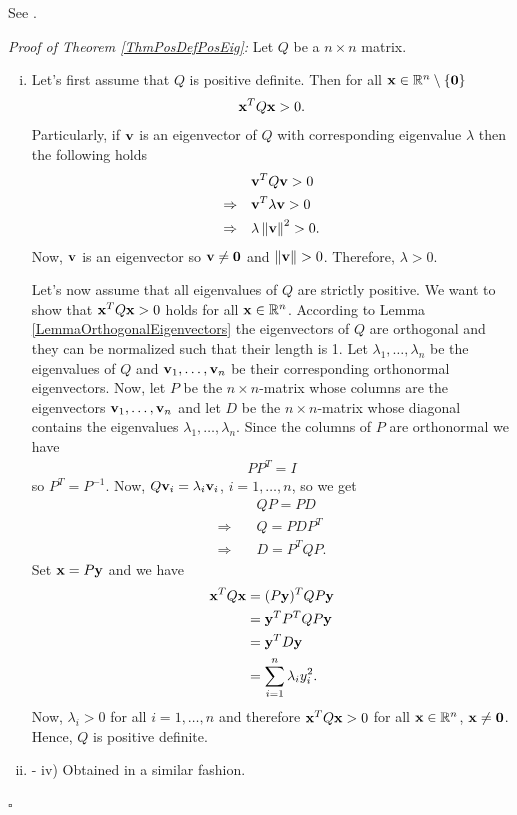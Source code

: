 \documentclass[a4paper,12pt,twoside,BCOR=10mm]{scrbook}
\begin{document}
See \citep{peressini1988mathematics}.

\textit{Proof of Theorem \ref{ThmPosDefPosEig}:}
Let $Q$ be a $n \times n$ matrix.
\begin{enumerate}[i)]
    \item
    Let's first assume that $Q$ is positive definite. Then for all $\mathbf{x} \in \mathbb{R}^{n}\setminus\{\mathbf{0}\}$
\begin{align*}
    \mathbf{x}^T Q \mathbf{x} > 0.
\end{align*}
Particularly, if $\mathbf{v}$ is an eigenvector of $Q$ with corresponding eigenvalue $\lambda$ then the following holds
\begin{align*}
    &\mathbf{v}^T Q \mathbf{v} > 0\\
    \Rightarrow\quad& \mathbf{v}^T \lambda \mathbf{v} > 0\\
    \Rightarrow\quad& \lambda \left\lVert\mathbf{v}\right\rVert^2 > 0.
\end{align*}
Now, $\mathbf{v}$ is an eigenvector so $\mathbf{v} \neq \mathbf{0}$ and $\left\lVert\mathbf{v}\right\rVert > 0$. Therefore, $\lambda > 0$.

Let's now assume that all eigenvalues of $Q$ are strictly positive. We want to show that $\mathbf{x}^T Q \mathbf{x} > 0$ holds for all $\mathbf{x} \in \mathbb{R}^{n}$. According to Lemma \ref{LemmaOrthogonalEigenvectors} the eigenvectors of $Q$ are orthogonal and they can be normalized such that their length is 1. Let $\lambda_1, \ldots, \lambda_n$ be the eigenvalues of $Q$ and $\mathbf{v}_1, \ldots, \mathbf{v}_n$ be their corresponding orthonormal eigenvectors. Now, let $P$ be the $n\times n$-matrix whose columns are the eigenvectors $\mathbf{v}_1, \ldots, \mathbf{v}_n$ and let $D$ be the $n\times n$-matrix whose diagonal contains the eigenvalues $\lambda_1, \ldots, \lambda_n$. Since the columns of $P$ are orthonormal we have
\begin{align*}
    PP^T = I
\end{align*}
so $P^T = P^{-1}$. Now, $Q\mathbf{v}_i = \lambda_i \mathbf{v}_i$, $i = 1, \ldots, n$, so we get
\begin{align*}
    &QP = PD\\
    \Rightarrow\quad&Q = PDP^T\\
    \Rightarrow\quad&D = P^TQP.
\end{align*}
Set $\mathbf{x} = P\mathbf{y}$ and we have
\begin{align*}
    \mathbf{x}^T Q \mathbf{x} &= (P\mathbf{y})^TQP\mathbf{y}\\
    &= \mathbf{y}^T P^T Q P \mathbf{y}\\
    &= \mathbf{y}^T D \mathbf{y}\\
    &= \sum_{i = 1}^n \lambda_i y_i^2.
\end{align*}
Now, $\lambda_i > 0$ for all $i = 1, \ldots, n$ and therefore $\mathbf{x}^T Q \mathbf{x} > 0$ for all $\mathbf{x} \in \mathbb{R}^{n}$, $\mathbf{x} \neq \mathbf{0}$. Hence, $Q$ is positive definite.
\item - iv) Obtained in a similar fashion.
\end{enumerate}
\hfill $\square$
\end{document}
